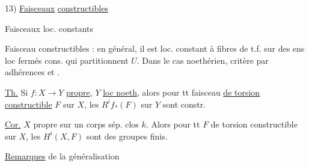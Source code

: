 
13) \uline{Faisceaux} \uline{constructibles}

Faisceaux loc.  constants

Faisceau constructibles : en général, il est loc. constant à fibres  de t.f. sur des ens loc fermés cons. qui partitionnent $U$. Dans le cas noethérien, critère par adhérences  et .

\uline{Th.} Si $f:X\to Y$ \uline{propre}, $Y$ \uline{loc noeth}, alors pour tt faisceau \uline{de torsion} \uline{constructible} $F$ sur $X$, les $R^if_*(F)$ sur $Y$ sont constr.

\uline{Cor.} $X$ propre sur un corps sép. clos $k$. Alors pour tt $F$ de torsion constructible sur $X$, les $H^i(X,F)$ sont des groupes finis.

\uline{Remarques}  de la généralisation
